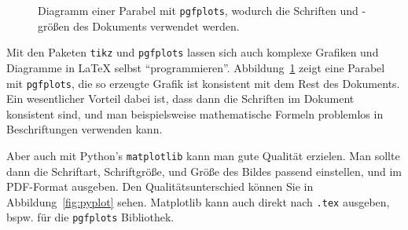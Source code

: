 \begin{figure}[bt!]\centering
{}
\caption{Diagramm einer Parabel mit \texttt{pgfplots}, wodurch die Schriften und -größen des Dokuments verwendet werden.}
\label{fig:parabel}
\end{figure}

Mit den Paketen \texttt{tikz} und \texttt{pgfplots} lassen sich auch komplexe Grafiken und Diagramme
in \LaTeX{} selbst \enquote{programmieren}.
Abbildung~\ref{fig:parabel} zeigt eine Parabel mit \texttt{pgfplots}, die so erzeugte Grafik ist konsistent mit dem Rest des Dokuments.
Ein wesentlicher Vorteil dabei ist, dass dann die Schriften im Dokument konsistent sind,
und man beispielsweise mathematische Formeln problemlos in Beschriftungen verwenden kann.

Aber auch mit Python's \texttt{matplotlib} kann man gute Qualität erzielen. Man sollte dann die Schriftart, Schriftgröße, und Größe des Bildes passend einstellen, und im PDF-Format ausgeben.
Den Qualitätsunterschied können Sie in Abbildung~\ref{fig:pyplot} sehen. Matplotlib kann auch direkt nach \texttt{.tex} ausgeben, bspw.{} für die \texttt{pgfplots} Bibliothek.

